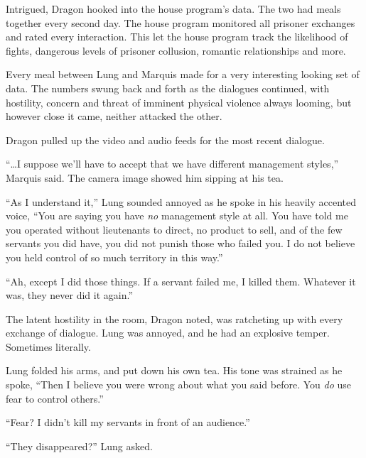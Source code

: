 Intrigued, Dragon hooked into the house program's data.  The two had meals together every second day.  The house program monitored all prisoner exchanges and rated every interaction.  This let the house program track the likelihood of fights, dangerous levels of prisoner collusion, romantic relationships and more.



Every meal between Lung and Marquis made for a very interesting looking set of data.  The numbers swung back and forth as the dialogues continued, with hostility, concern and threat of imminent physical violence always looming, but however close it came, neither attacked the other.



Dragon pulled up the video and audio feeds for the most recent dialogue.



``\ldots{}I suppose we'll have to accept that we have different management styles,'' Marquis said.  The camera image showed him sipping at his tea.



``As I understand it,'' Lung sounded annoyed as he spoke in his heavily accented voice, ``You are saying you have \emph{no} management style at all.  You have told me you operated without lieutenants to direct, no product to sell, and of the few servants you did have, you did not punish those who failed you.  I do not believe you held control of so much territory in this way.''



``Ah, except I did those things.  If a servant failed me, I killed them.  Whatever it was, they never did it again.''



The latent hostility in the room, Dragon noted, was ratcheting up with every exchange of dialogue.  Lung was annoyed, and he had an explosive temper.  Sometimes literally.



Lung folded his arms, and put down his own tea.  His tone was strained as he spoke, ``Then I believe you were wrong about what you said before.  You \emph{do} use fear to control others.''



``Fear?  I didn't kill my servants in front of an audience.''



``They disappeared?'' Lung asked.



